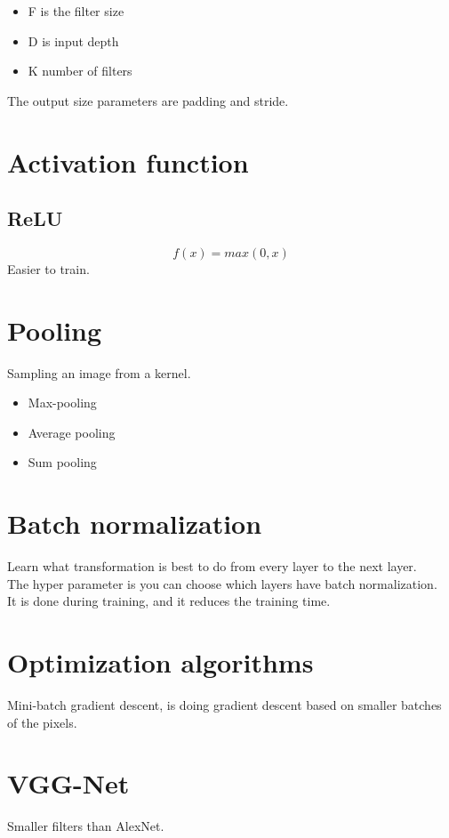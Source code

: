 \documentclass[a4paper]{article}
\begin{document}
\begin{itemize}
	\item F is the filter size
	\item D is input depth
	\item K number of filters
\end{itemize}

The output size parameters are padding and stride. 


\section{Activation function}
\subsection{ReLU}
\begin{equation}
f(x) = max(0,x)
\end{equation}
Easier to train.

\section{Pooling}
Sampling an image from a kernel. 
\begin{itemize}
	\item Max-pooling
	\item Average pooling
	\item Sum pooling
\end{itemize}
 

\section{Batch normalization}
Learn what transformation is best to do from every layer to the next layer. \\
The hyper parameter is you can choose which layers have batch normalization. \\
It is done during training, and it reduces the training time. 



\section{Optimization algorithms}

Mini-batch gradient descent, is doing gradient descent based on smaller batches of the pixels. 


\section{VGG-Net}
Smaller filters than AlexNet.
\end{document}
